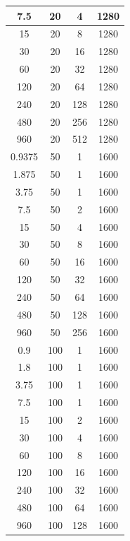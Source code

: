 \documentclass[a4paper, 12pt]{article}
\begin{document}
\begin{longtable}[c]{|c|c|c|c|}
7.5        & 20              & 4              & 1280    \\ \hline
15         & 20              & 8              & 1280    \\ \hline
30         & 20              & 16             & 1280    \\ \hline
60         & 20              & 32             & 1280    \\ \hline
120        & 20              & 64             & 1280    \\ \hline
240        & 20              & 128            & 1280    \\ \hline
480        & 20              & 256            & 1280    \\ \hline
960        & 20              & 512            & 1280    \\ \hline
0.9375     & 50              & 1              & 1600    \\ \hline
1.875      & 50              & 1              & 1600    \\ \hline
3.75       & 50              & 1              & 1600    \\ \hline
7.5        & 50              & 2              & 1600    \\ \hline
15         & 50              & 4              & 1600    \\ \hline
30         & 50              & 8              & 1600    \\ \hline
60         & 50              & 16             & 1600    \\ \hline
120        & 50              & 32             & 1600    \\ \hline
240        & 50              & 64             & 1600    \\ \hline
480        & 50              & 128            & 1600    \\ \hline
960        & 50              & 256            & 1600    \\ \hline
0.9        & 100             & 1              & 1600    \\ \hline
1.8        & 100             & 1              & 1600    \\ \hline
3.75       & 100             & 1              & 1600    \\ \hline
7.5        & 100             & 1              & 1600    \\ \hline
15         & 100             & 2              & 1600    \\ \hline
30         & 100             & 4              & 1600    \\ \hline
60         & 100             & 8              & 1600    \\ \hline
120        & 100             & 16             & 1600    \\ \hline
240        & 100             & 32             & 1600    \\ \hline
480        & 100             & 64             & 1600    \\ \hline
960        & 100             & 128            & 1600    \\ \hline


\end{longtable}
\end{document}
